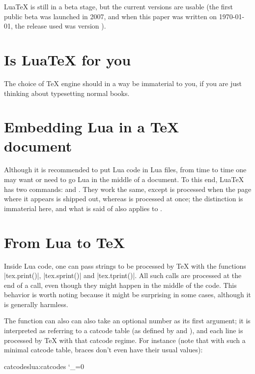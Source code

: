 Lua\TeX{} is still in a beta stage, but the current versions are usable (the first public beta was launched in 2007,
and when this paper was written on \today, the release used was version \the\luatexversion). 

\section{Is LuaTeX for you}

The choice of TeX engine should in a way be immaterial to you, if you are just thinking about typesetting normal books.

\section{Embedding Lua in a TeX document}

\begin{macro}{\directlua}
Although it is recommended to put Lua code in Lua files, from time to time one may want or need to go Lua in the middle of a document. To this end, LuaTeX has two commands: \cmd{\directlua} and \cmd{\latelua}. They work the same, except \cmd{\latelua} is processed when the page where it appears is shipped out, whereas \cmd{\directlua} is processed at once; the distinction is immaterial here, and what is said of \cmd{\directlua} also applies to \cmd{\latelua}.
\end{macro}

\section{From Lua to TeX}

Inside Lua code, one can pass strings to be processed by TeX with the functions |tex.print()|, |tex.sprint()| and |tex.tprint()|. All such calls are processed at the end of a \cmd{\directlua} call, even though they might happen in the middle of the code. This behavior is worth noting because it might be surprising in some cases, although it is generally harmless.

The function can also can also take an optional number as its first argument; it is interpreted as referring to a catcode table (as defined by \cmd{\initcatcodetable} and \cmd{\savecatcodetable}), and each line is processed by TeX with that catcode regime. For instance (note that with such a minimal catcode table, braces don't even have their usual values):

\begin{texexample}{catcodes}{lua:catcodes}
\bgroup
{}
\catcode`\_=0
\egroup
{}
\end{texexample}

